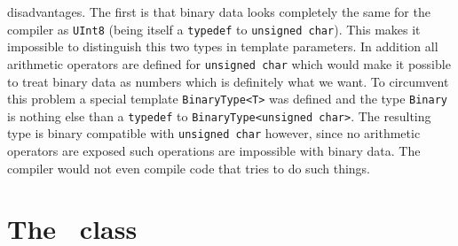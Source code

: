 disadvantages. The first is that binary data looks completely the same 
for the compiler as {\tt UInt8} (being itself a {\tt typedef} to {\tt unsigned
char}). This makes it impossible to distinguish this two types in template
parameters. In addition all arithmetic operators are defined for {\tt unsigned
char} which would make it possible to treat binary data as numbers which is
definitely what we want. To circumvent this problem a special template 
{\tt BinaryType<T>} was defined and the type {\tt Binary} is nothing else 
than a {\tt typedef} to {\tt BinaryType<unsigned char>}. The resulting type is
binary compatible with {\tt unsigned char} however, since no arithmetic
operators are exposed such operations are impossible with binary data. 
The compiler would not even compile code that tries to do such things. 


\section{The \nxfield\ class}
